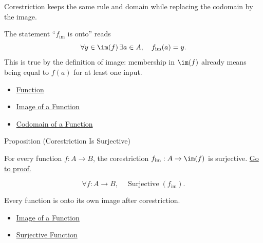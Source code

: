 \begin{remark*}[Interpretation]
Corestriction keeps the same rule and domain while replacing the codomain by
the image.
\end{remark*}

\begin{remark*}[Exposition]
The statement ``$f_{\operatorname{im}}$ is onto'' reads
\[
\forall y\in\im(f)\,\exists a\in A,\quad f_{\operatorname{im}}(a)=y.
\]
This is true by the definition of image: membership in $\im(f)$ already means
being equal to $f(a)$ for at least one input.
\end{remark*}

\begin{dependencies}
\begin{itemize}
  \item \hyperref[def:function]{Function}
  \item \hyperref[def:image-function]{Image of a Function}
  \item \hyperref[def:codomain]{Codomain of a Function}
\end{itemize}
\end{dependencies}

\begin{propositionbox}{Proposition (Corestriction Is Surjective)}
\begin{proposition}\label{prop:corestriction-surjective}
For every function $f:A\to B$, the corestriction
$f_{\operatorname{im}}:A\to\im(f)$ is surjective.
\hyperref[prf:corestriction-surjective]{Go to proof.}
\end{proposition}
\end{propositionbox}

\begin{remark*}
\[
  \forall f:A\to B,\quad
  \operatorname{Surjective}(f_{\operatorname{im}}).
\]
\end{remark*}

\begin{remark*}[Interpretation]
Every function is onto its own image after corestriction.
\end{remark*}

\begin{dependencies}
\begin{itemize}
  \item \hyperref[def:image-function]{Image of a Function}
  \item \hyperref[def:surjective]{Surjective Function}
\end{itemize}
\end{dependencies}


